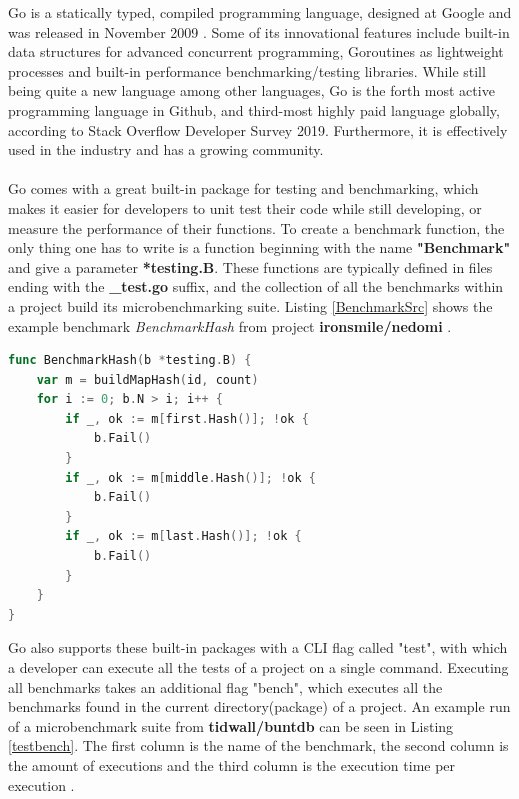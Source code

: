 \documentclass{seal_thesis}
\begin{document}
Go is a statically typed, compiled programming language, designed at Google and was released in November 2009 \cite{go}. Some of its innovational features include built-in data structures for advanced concurrent programming, Goroutines as lightweight processes and built-in performance benchmarking/testing libraries. While still being quite a new language among other languages, Go is the forth most active programming language in Github, and third-most highly paid language globally, according to Stack Overflow Developer Survey 2019\cite{stackoverflowdev}. Furthermore, it is effectively used in the industry and has a growing community.\\
\\
Go comes with a great built-in package for testing and benchmarking, which makes it easier for developers to unit test their code while still developing, or measure the performance of their functions\cite{gobench}. To create a benchmark function, the only thing one has to write is a function beginning with the name \textbf{"Benchmark"} and give a parameter \textbf{*testing.B}. These functions are typically defined in files ending with the \textbf{\_test.go} suffix, and the collection of all the benchmarks within a project build its microbenchmarking suite. Listing \ref{BenchmarkSrc} shows the example benchmark \textit{BenchmarkHash} from project \textbf{ironsmile/nedomi} \cite{ironsmile/nedomi}.


\begin{lstlisting}[caption=An example benchmark from \cite{ironsmile/nedomi}., label={BenchmarkSrc}, language=Go, frame=single]
func BenchmarkHash(b *testing.B) {
	var m = buildMapHash(id, count)
	for i := 0; b.N > i; i++ {
		if _, ok := m[first.Hash()]; !ok {
			b.Fail()
		}
		if _, ok := m[middle.Hash()]; !ok {
			b.Fail()
		}
		if _, ok := m[last.Hash()]; !ok {
			b.Fail()
		}
	}
}
\end{lstlisting}

\noindent Go also supports these built-in packages with a CLI flag called "test", with which a developer can execute all the tests of a project on a single command. Executing all benchmarks takes an additional flag "bench", which executes all the benchmarks found in the current directory(package) of a project. An example run of a microbenchmark suite from \textbf{tidwall/buntdb} \cite{tidwall/buntdb} can be seen in Listing \ref{testbench}. The first column is the name of the benchmark, the second column is the amount of executions and the third column is the execution time per execution \cite{gobench}.
\end{document}
